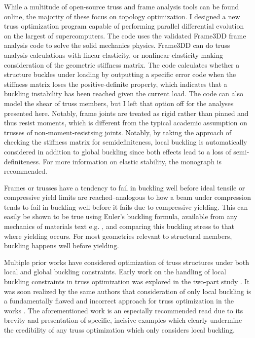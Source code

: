 \documentclass{article}
\begin{document}
While a multitude of open-source truss and frame analysis tools can be found online,
the majority of these focus on topology optimization. I designed a new truss optimization
program capable of performing parallel differential evolution on the largest of supercomputers.
The code uses the validated Frame3DD frame analysis code \cite{gavinUserManualReference}
to solve the solid mechanics physics. Frame3DD can do truss analysis calculations with linear elasticity,
or nonlinear elasticity making consideration of the geometric stiffness matrix. The code calculates whether
a structure buckles under loading by outputting a specific error code when the stiffness
matrix loses the positive-definite property, which indicates that a buckling instability has been reached
given the current load. The code can also model the shear of truss members, but I left that
option off for the analyses presented here. Notably, frame joints are treated as rigid rather than
pinned and thus resist moments, which is different from the typical academic assumption on
trusses of non-moment-resistsing joints. Notably, by taking the approach of checking the stiffness
matrix for semidefiniteness, local buckling is automatically considered in addition to global
buckling since both effects lead to a loss of semi-definiteness. For more information on
elastic stability, the monograph \cite{timoshenkoTheoryElasticStability2009} is recommended.

Frames or trusses have a tendency to fail in buckling well before ideal
tensile or compressive yield limits are reached--analogous to how a beam
under compression tends to fail in buckling well before it fails due to
compressive yielding. This can easily be shown to be true using Euler's
buckling formula, available from any mechanics of materials text e.g. \cite{gereMechanicsMaterials1996}, and
comparing this buckling stress to that where yielding occurs. For most
geometries relevant to structural members, buckling happens well before
yielding.

Multiple prior works have considered optimization of truss structures under both local
and global buckling constraints. Early work on the handling of local buckling constraints
in truss optimization was explored in the two-part study \cite{zhouDCOCOptimalityCriteria1992}.
It was soon realized by the same authors that consideration of only local buckling is a
fundamentally flawed and incorrect approach for truss optimization in the works \cite{zhouDifficultiesTrussTopology1996,rozvanyDifficultiesTrussTopology1996}.
The aforementioned work \cite{zhouDifficultiesTrussTopology1996} is an especially recommended
read due to its brevity and presentation of specific, incisive examples which clearly undermine the
credibility of any truss optimization which only considers local buckling.
\end{document}
